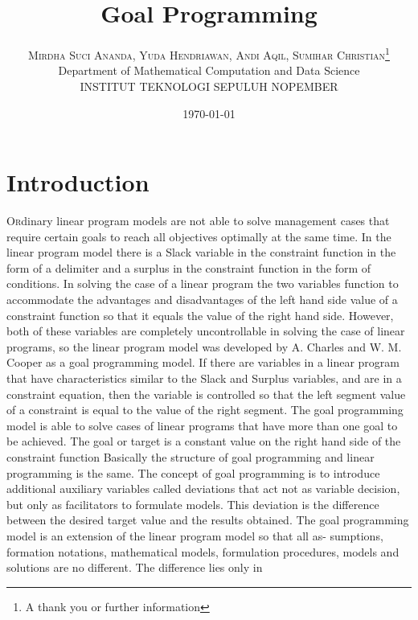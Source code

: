 \documentclass[twoside,twocolumn]{article}
\title{Goal Programming} %
\author{%
\textsc{Mirdha Suci Ananda, Yuda Hendriawan, Andi Aqil, Sumihar Christian}\thanks{A thank you or further information} \\[1ex] %
\normalsize Department of Mathematical Computation and Data Science \\ %
\normalsize INSTITUT TEKNOLOGI SEPULUH NOPEMBER\\ %
}
\date{\today} %
\begin{document}
\maketitle


\section{Introduction}

\lettrine[nindent=0em,lines=3]{O} rdinary linear program models are not able to solve management cases that require certain
goals to reach all objectives optimally at the same time. In the linear program model there
is a Slack variable in the constraint function in the form of a delimiter and a surplus in the
constraint function in the form of conditions. In solving the case of a linear program the two
variables function to accommodate the advantages and disadvantages of the left hand side value
of a constraint function so that it equals the value of the right hand side. However, both of
these variables are completely uncontrollable in solving the case of linear programs, so the linear
program model was developed by A. Charles and W. M. Cooper as a goal programming model.
If there are variables in a linear program that have characteristics similar to the Slack and
Surplus variables, and are in a constraint equation, then the variable is controlled so that the left
segment value of a constraint is equal to the value of the right segment. The goal programming
model is able to solve cases of linear programs that have more than one goal to be achieved.
The goal or target is a constant value on the right hand side of the constraint function
Basically the structure of goal programming and linear programming is the same. The
concept of goal programming is to introduce additional auxiliary variables called deviations
that act not as variable decision, but only as facilitators to formulate models. This deviation
is the difference between the desired target value and the results obtained.
The goal programming model is an extension of the linear program model so that all as-
sumptions, formation notations, mathematical models, formulation procedures, models and
solutions are no different. The difference lies only in

\end{document}
